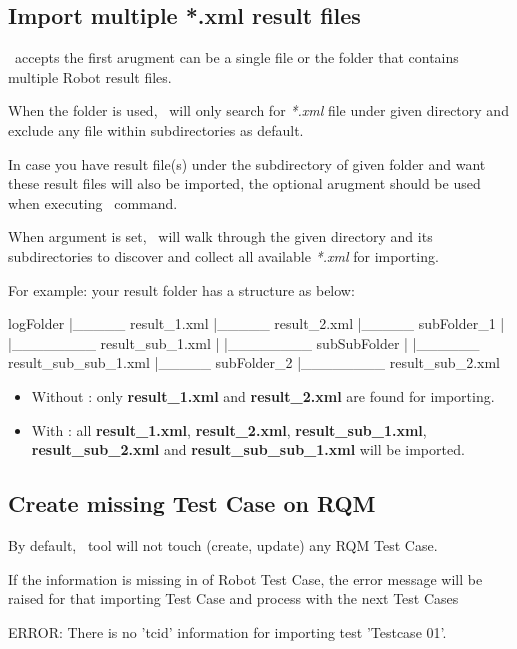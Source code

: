 \subsection{Import multiple *.xml result files}
\pkg\ accepts the first arugment  can be a single file or
the folder that contains multiple Robot result files.

When the folder is used, \pkg\ will only search for \emph{*.xml} file under
given directory and exclude any file within subdirectories as default.

In case you have result file(s) under the subdirectory of given folder and want
these result files will also be imported, the optional arugment
 should be used when executing \pkg\ command.

When  argument is set, \pkg\ will walk through the given
directory and its subdirectories to discover and collect all available
\emph{*.xml} for importing.

For example: your result folder has a structure as below:

\begin{robotlog}
logFolder
   |_____ result_1.xml
   |_____ result_2.xml
   |_____ subFolder_1
   |         |________ result_sub_1.xml
   |         |________ subSubFolder
   |                       |______ result_sub_sub_1.xml
   |_____ subFolder_2
             |________ result_sub_2.xml
\end{robotlog}

\begin{itemize}
\item Without : only \textbf{result\_1.xml} and
      \textbf{result\_2.xml} are found for importing.
\item With : all \textbf{result\_1.xml},
      \textbf{result\_2.xml}, \textbf{result\_sub\_1.xml},
      \textbf{result\_sub\_2.xml} and \textbf{result\_sub\_sub\_1.xml} will
      be imported.
\end{itemize}

\subsection{Create missing Test Case on RQM}
By default, \pkg\ tool will not touch (create, update) any RQM Test Case.

If the  information is missing in \rcode{[Tags]} of Robot Test
Case, the error message will be raised for that importing Test Case and process
with the next Test Cases
\begin{pythonlog}
ERROR: There is no 'tcid' information for importing test 'Testcase 01'.
\end{pythonlog}

